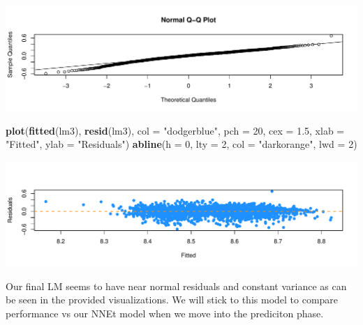 \documentclass[]{report}
\newenvironment{Shaded}{\begin{snugshade}}{\end{snugshade}}
\newcommand{\DataTypeTok}[1]{\textcolor[rgb]{0.13,0.29,0.53}{#1}}
\newcommand{\DecValTok}[1]{\textcolor[rgb]{0.00,0.00,0.81}{#1}}
\newcommand{\FloatTok}[1]{\textcolor[rgb]{0.00,0.00,0.81}{#1}}
\newcommand{\KeywordTok}[1]{\textcolor[rgb]{0.13,0.29,0.53}{\textbf{#1}}}
\newcommand{\NormalTok}[1]{#1}
\newcommand{\OperatorTok}[1]{\textcolor[rgb]{0.81,0.36,0.00}{\textbf{#1}}}
\newcommand{\StringTok}[1]{\textcolor[rgb]{0.31,0.60,0.02}{#1}}
\begin{document}
\begin{Shaded}
\end{Shaded}

\includegraphics{Project2-VH_files/figure-latex/project2a12-2.pdf}

\begin{Shaded}
\begin{Highlighting}[]
\KeywordTok{plot}\NormalTok{(}\KeywordTok{fitted}\NormalTok{(lm3), }\KeywordTok{resid}\NormalTok{(lm3), }\DataTypeTok{col =} \StringTok{"dodgerblue"}\NormalTok{, }\DataTypeTok{pch =} \DecValTok{20}\NormalTok{, }\DataTypeTok{cex =} \FloatTok{1.5}\NormalTok{, }
    \DataTypeTok{xlab =} \StringTok{"Fitted"}\NormalTok{, }\DataTypeTok{ylab =} \StringTok{"Residuals"}\NormalTok{)}
\KeywordTok{abline}\NormalTok{(}\DataTypeTok{h =} \DecValTok{0}\NormalTok{, }\DataTypeTok{lty =} \DecValTok{2}\NormalTok{, }\DataTypeTok{col =} \StringTok{"darkorange"}\NormalTok{, }\DataTypeTok{lwd =} \DecValTok{2}\NormalTok{)}
\end{Highlighting}
\end{Shaded}

\includegraphics{Project2-VH_files/figure-latex/project2a12-3.pdf}

Our final LM seems to have near normal residuals and constant variance
as can be seen in the provided visualizations. We will stick to this
model to compare performance vs our NNEt model when we move into the
prediciton phase.
\end{document}
